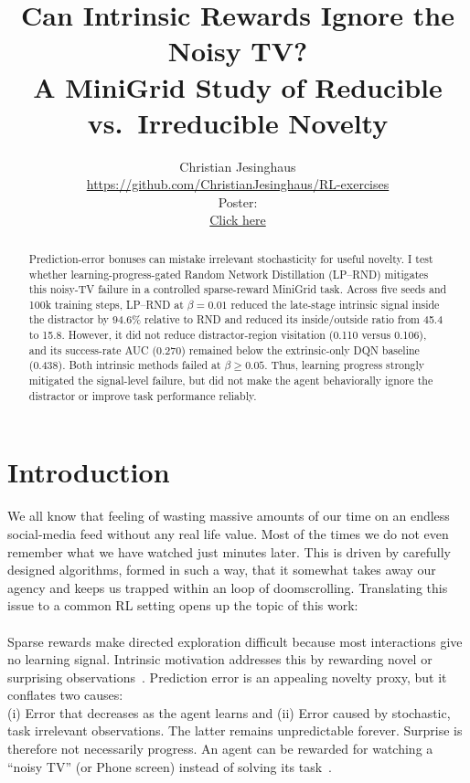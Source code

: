 \documentclass{article}
\title{Can Intrinsic Rewards Ignore the Noisy TV?\\
A MiniGrid Study of Reducible vs.\ Irreducible Novelty}
\author{Christian Jesinghaus\\
\url{https://github.com/ChristianJesinghaus/RL-exercises}\\
Poster:\\
\href{https://docs.google.com/presentation/d/1PzbG9yEkm_U5BohGgoPV5AqeIblFksgSRxyDa3qFiPk/edit?usp=sharing}{Click here}
}\\
\newcommand{\lprnd}{LP--RND}
\begin{document}
\maketitle

\begin{abstract}
Prediction-error bonuses can mistake irrelevant stochasticity for useful
novelty.  I test whether learning-progress-gated Random Network Distillation
(\lprnd) mitigates this noisy-TV failure in a controlled sparse-reward
MiniGrid task.  Across five seeds and 100k training steps, \lprnd{} at
$\beta=0.01$ reduced the late-stage intrinsic signal inside the distractor by
94.6\% relative to RND and reduced its inside/outside ratio from 45.4 to 15.8.
However, it did not reduce distractor-region visitation (0.110 versus 0.106),
and its success-rate AUC (0.270) remained below the extrinsic-only DQN
baseline (0.438).  Both intrinsic methods failed at $\beta\geq0.05$.  Thus,
learning progress strongly mitigated the signal-level failure, but did not
make the agent behaviorally ignore the distractor or improve task performance
reliably.
\end{abstract}

\section{Introduction}
We all know that feeling of wasting massive amounts of our time on an endless social-media feed without any real life value. Most of the times we do not even remember what we have watched just minutes later. This is driven by carefully designed algorithms, formed in such a way, that it somewhat takes away our agency and keeps us trapped within an loop of doomscrolling. Translating this issue to a common RL setting opens up the topic of this work:\\\\
Sparse rewards make directed exploration difficult because most interactions give no
learning signal.  Intrinsic motivation addresses this by rewarding novel or
surprising observations~\citep{bellemare-nips16,burda-iclr19}.  Prediction
error is an appealing novelty proxy, but it conflates two causes:\\ 
(i) Error that decreases as the agent learns and (ii) Error caused by stochastic, task irrelevant observations.  The latter remains unpredictable forever.  Surprise is
therefore not necessarily progress. An agent can be rewarded for watching a
``noisy TV'' (or Phone screen) instead of solving its task~\citep{mavorparker2022noisytv}.
\end{document}
